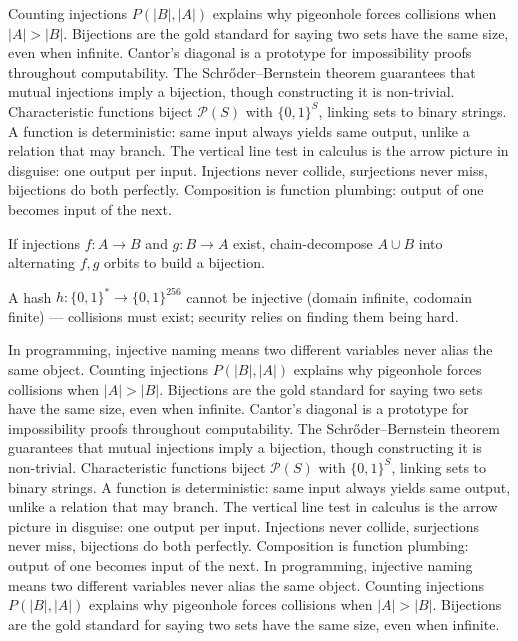 Counting injections $P(|B|,|A|)$ explains why pigeonhole forces collisions when $|A|>|B|$.
Bijections are the gold standard for saying two sets have the same size, even when infinite.
Cantor's diagonal is a prototype for impossibility proofs throughout computability.
The Schr\H{o}der--Bernstein theorem guarantees that mutual injections imply a bijection, though constructing it is non-trivial.
Characteristic functions biject $\mathcal{P}(S)$ with $\{0,1\}^S$, linking sets to binary strings.
A function is deterministic: same input always yields same output, unlike a relation that may branch.
The vertical line test in calculus is the arrow picture in disguise: one output per input.
Injections never collide, surjections never miss, bijections do both perfectly.
Composition is function plumbing: output of one becomes input of the next.

\begin{theorem}
If injections $f:A\to B$ and $g:B\to A$ exist, chain-decompose $A\cup B$ into alternating $f,g$ orbits to build a bijection.
\end{theorem}

\begin{example}
A hash $h:\{0,1\}^*\to\{0,1\}^{256}$ cannot be injective (domain infinite, codomain finite) --- collisions must exist; security relies on finding them being hard.
\end{example}

In programming, injective naming means two different variables never alias the same object.
Counting injections $P(|B|,|A|)$ explains why pigeonhole forces collisions when $|A|>|B|$.
Bijections are the gold standard for saying two sets have the same size, even when infinite.
Cantor's diagonal is a prototype for impossibility proofs throughout computability.
The Schr\H{o}der--Bernstein theorem guarantees that mutual injections imply a bijection, though constructing it is non-trivial.
Characteristic functions biject $\mathcal{P}(S)$ with $\{0,1\}^S$, linking sets to binary strings.
A function is deterministic: same input always yields same output, unlike a relation that may branch.
The vertical line test in calculus is the arrow picture in disguise: one output per input.
Injections never collide, surjections never miss, bijections do both perfectly.
Composition is function plumbing: output of one becomes input of the next.
In programming, injective naming means two different variables never alias the same object.
Counting injections $P(|B|,|A|)$ explains why pigeonhole forces collisions when $|A|>|B|$.
Bijections are the gold standard for saying two sets have the same size, even when infinite.


